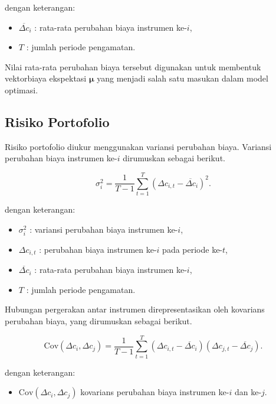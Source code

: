     dengan keterangan:
    \begin{itemize}
        \item $\overline{\Delta c}_i$ : rata-rata perubahan biaya instrumen ke-$i$,
        \item $T$ : jumlah periode pengamatan.
    \end{itemize}

    Nilai rata-rata perubahan biaya tersebut digunakan untuk membentuk vektorbiaya ekspektasi $\boldsymbol{\mu}$ yang menjadi salah satu masukan dalam model optimasi.


    \subsection{Risiko Portofolio}\label{sub:risiko}
    Risiko portofolio diukur menggunakan variansi perubahan biaya. Variansi perubahan biaya instrumen ke-$i$ dirumuskan sebagai berikut.

    \begin{equation}
        \label{eq:varians-instrumen}
        \sigma_i^2 = \frac{1}{T-1}\sum_{t=1}^{T}\left(\Delta c_{i,t} - \overline{\Delta c}_i\right)^2.
    \end{equation}

    dengan keterangan:
    \begin{itemize}
        \item $\sigma_i^2$ : variansi perubahan biaya instrumen ke-$i$,
        \item $\Delta c_{i,t}$ : perubahan biaya instrumen ke-$i$ pada periode ke-$t$,
        \item $\overline{\Delta c}_i$ : rata-rata perubahan biaya instrumen ke-$i$,
        \item $T$ : jumlah periode pengamatan.
    \end{itemize}

    Hubungan pergerakan antar instrumen direpresentasikan oleh kovarians perubahan biaya, yang dirumuskan sebagai berikut.

    \begin{equation}
        \label{eq:kovarians}
        \mathrm{Cov}(\Delta c_i, \Delta c_j) = \frac{1}{T-1}\sum_{t=1}^{T} \left(\Delta c_{i,t} - \overline{\Delta c}_i\right) \left(\Delta c_{j,t} - \overline{\Delta c}_j\right).
    \end{equation}

    dengan keterangan:
    \begin{itemize}
        \item $\mathrm{Cov}(\Delta c_i, \Delta c_j)$ kovarians perubahan biaya instrumen ke-$i$ dan ke-$j$.
    \end{itemize}

